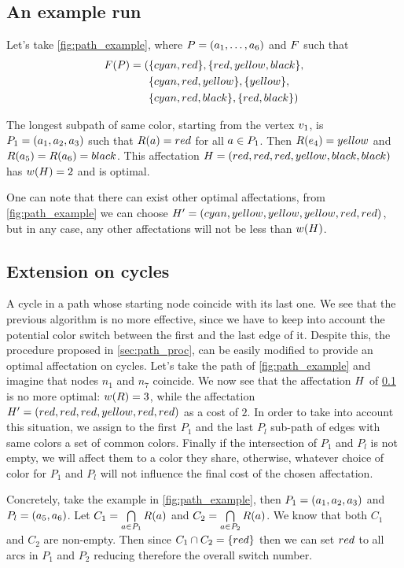 \subsection{An example run}
\label{sec:path_ex_run}



Let's take \cref{fig:path_example}, where $P = (a_1,\ldots,a_{6})$ and $F$ such that
\begin{align*}
  F(P) = ( & \{cyan,red\}, \{red,yellow,black\},    \\
                   & \{cyan,red,yellow\}, \{yellow\},    \\
                   & \{cyan,red,black\}, \{red,black\}   )
\end{align*}

The longest subpath of same color, starting from the vertex $v_1$, is $P_1 = (a_1, a_2, a_3)$ such that $R(a) = red$ for all $a \in P_1$. Then $R(e_4) = yellow$ and $R(a_5) = R(a_6) = black$. This affectation $H = (red, red, red, yellow, black, black)$ has $w(H) = 2$ and is optimal.

One can note that there can exist other optimal affectations, from \cref{fig:path_example} we can choose $H' = (cyan, yellow, yellow, yellow, red, red)$, but in any case, any other affectations will not be less than  $w(H)$.

\subsection{Extension on cycles}

A cycle in a path whose starting node coincide with its last one.
We see that the previous algorithm is no more effective, since we have to keep into account the potential color switch between the first and the last edge of it.
Despite this, the procedure proposed in \cref{sec:path_proc}, can be easily modified to provide an optimal affectation on cycles.
Let's take the path of \cref{fig:path_example} and imagine that nodes $n_1$ and $n_7$ coincide.
We now see that the affectation $H$ of \cref{sec:path_ex_run} is no more optimal: $w(R) = 3$, while the affectation $H' = (red, red, red, yellow, red, red)$ as a cost of $2$.
In order to take into account this situation, we assign to the first $P_1$ and the last $P_l$ sub-path of edges with same colors a set of common colors. Finally if the intersection of $P_1$ and $P_l$ is not empty, we will affect them to a color they share, otherwise, whatever choice of color for $P_1$ and $P_l$ will not influence the final cost of the chosen affectation.

Concretely, take the example in \cref{fig:path_example}, then $P_1 = (a_1, a_2, a_3)$ and $P_l = (a_5, a_6)$. Let $C_1 = \bigcap\limits_{a\in P_1} R(a)$ and $C_2 = \bigcap\limits_{a\in P_2} R(a)$. We know that both $C_1$ and $C_2$ are non-empty. Then since $C_1 \cap C_2 = \{red\}$ then we can set $red$ to all arcs in $P_1$ and $P_2$ reducing therefore the overall switch number.

